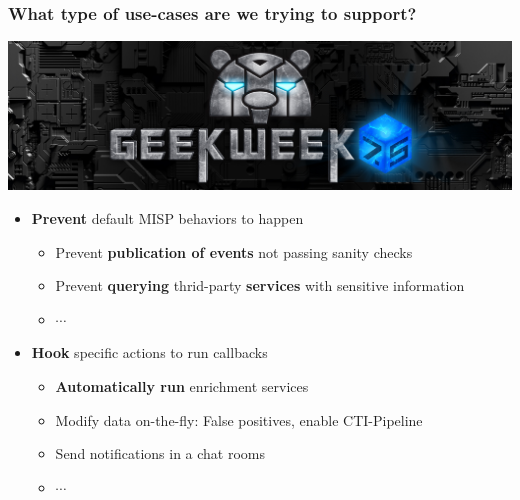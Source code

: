 \begin{frame}
    \frametitle{What type of use-cases are we trying to support?}
    \vspace{-1em}
    \begin{center}
        \includegraphics[width=0.5\linewidth]{pictures/geekweek75.jpg}
    \end{center}
    \begin{itemize}
        \item \textbf{Prevent} default MISP behaviors to happen
        \begin{itemize}
            \item Prevent \textbf{publication of events} not passing sanity checks
            \item Prevent \textbf{querying} thrid-party \textbf{services} with sensitive information
            \item $\cdots$
        \end{itemize}
        \vspace*{1.0em}
        \item \textbf{Hook} specific actions to run callbacks
        \begin{itemize}
            \item \textbf{Automatically run} enrichment services
            \item Modify data on-the-fly: False positives, enable CTI-Pipeline
            \item Send notifications in a chat rooms
            \item $\cdots$
        \end{itemize}
    \end{itemize}
\end{frame}

